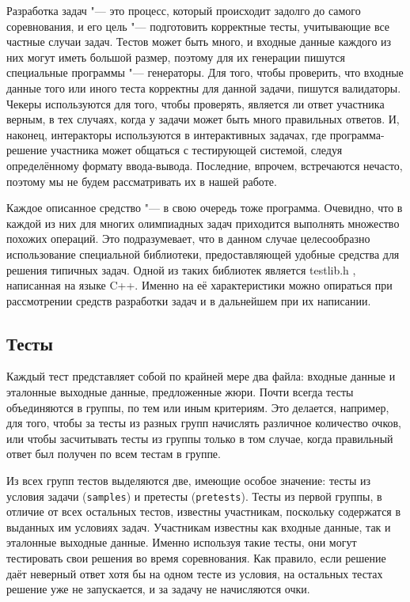 Разработка задач "--- это процесс, который происходит задолго до самого соревнования, и его цель "--- подготовить корректные тесты, учитывающие все частные случаи задач. Тестов может быть много, и входные данные каждого из них могут иметь большой размер, поэтому для их генерации пишутся специальные программы "--- генераторы. Для того, чтобы проверить, что входные данные того или иного теста корректны для данной задачи, пишутся валидаторы. Чекеры используются для того, чтобы проверять, является ли ответ участника верным, в тех случаях, когда у задачи может быть много правильных ответов. И, наконец, интеракторы используются в интерактивных задачах, где программа-решение участника может общаться с тестирующей системой, следуя определённому формату ввода-вывода. Последние, впрочем, встречаются нечасто, поэтому мы не будем рассматривать их в нашей работе.

Каждое описанное средство "--- в свою очередь тоже программа. Очевидно, что в каждой из них для многих олимпиадных задач приходится выполнять множество похожих операций. Это подразумевает, что в данном случае целесообразно использование специальной библиотеки, предоставляющей удобные средства для решения типичных задач. Одной из таких библиотек является testlib.h \cite{testlib}, написанная на языке C++. Именно на её характеристики можно опираться при рассмотрении средств разработки задач и в дальнейшем при их написании.

\subsection{Тесты}

Каждый тест представляет собой по крайней мере два файла: входные данные и эталонные выходные данные, предложенные жюри. Почти всегда тесты объединяются в группы, по тем или иным критериям. Это делается, например, для того, чтобы за тесты из разных групп начислять различное количество очков, или чтобы засчитывать тесты из группы только в том случае, когда правильный ответ был получен по всем тестам в группе.

Из всех групп тестов выделяются две, имеющие особое значение: тесты из условия задачи (\texttt{samples}) и претесты (\texttt{pretests}). Тесты из первой группы, в отличие от всех остальных тестов, известны участникам, поскольку содержатся в выданных им условиях задач. Участникам известны как входные данные, так и эталонные выходные данные. Именно используя такие тесты, они могут тестировать свои решения во время соревнования. Как правило, если решение даёт неверный ответ хотя бы на одном тесте из условия, на остальных тестах решение уже не запускается, и за задачу не начисляются очки.

